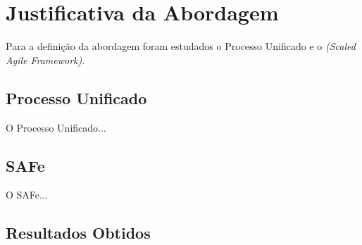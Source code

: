\section{Justificativa da Abordagem}
	\setlength{\parindent}{10ex}
	Para a definição da abordagem foram estudados o Processo Unificado e o \textit{(Scaled Agile Framework)}.

	\subsection{Processo Unificado}
	O Processo Unificado...
	\subsection{SAFe}
	O SAFe...
	\subsection{Resultados Obtidos}

